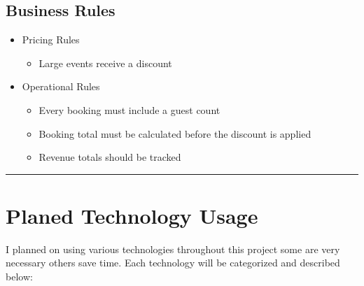 \documentclass[letterpaper,10pt,english]{sphinxmanual}
\begin{document}
\subsection{Business Rules}
\label{\detokenize{design/project-plan:business-rules}}\begin{itemize}
\item {} 
\sphinxAtStartPar
Pricing Rules
\begin{itemize}
\item {} 
\sphinxAtStartPar
Large events receive a discount

\end{itemize}

\item {} 
\sphinxAtStartPar
Operational Rules
\begin{itemize}
\item {} 
\sphinxAtStartPar
Every booking must include a guest count

\item {} 
\sphinxAtStartPar
Booking total must be calculated before the discount is applied

\item {} 
\sphinxAtStartPar
Revenue totals should be tracked

\end{itemize}

\end{itemize}


\bigskip\hrule\bigskip



\section{Planed Technology Usage}
\label{\detokenize{design/project-plan:planed-technology-usage}}
\sphinxAtStartPar
I planned on using various technologies throughout this project some are very necessary others save time. Each technology will be categorized and described below:
\end{document}
